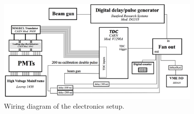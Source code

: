 \begin{figure}[h]
\includegraphics[width=0.9\textwidth]{Content/Methods/WiringDiagram.png}
\caption{Wiring diagram of the electronics setup. }
\label{fig:WiringDiagram}
\end{figure}
